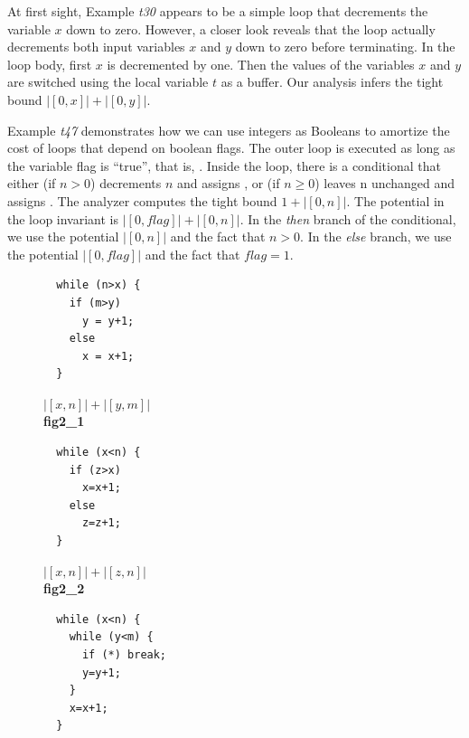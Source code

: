 \documentclass[nocopyrightspace,preprint,pldi]{sigplanconf-pldi15}
\begin{document}
{At first sight, Example \emph{t30} appears to be a simple loop that
decrements the variable $x$ down to zero.  However, a closer look
reveals that the loop actually decrements both input variables $x$ and
$y$ down to zero before terminating.  In the loop body, first $x$ is
decremented by one.  Then the values of the variables $x$ and $y$ are
switched using the local variable $t$ as a buffer.  Our analysis
infers the tight bound $|[0,x]|+|[0,y]|$.

Example \emph{t47} demonstrates how we can use integers as Booleans to
amortize the cost of loops that depend on boolean flags.  The outer
loop is executed as long as the variable flag is ``true'', that is,
.  Inside the loop, there is a conditional that either
(if $n>0$) decrements $n$ and assigns , or (if $n\geq0$)
leaves n unchanged and assigns .  The analyzer computes
the tight bound $1 + |[0, n]|$.  The potential in the loop invariant
is $|[0,\mathit{flag}]| + |[0, n]|$.  In the \emph{then} branch of
the conditional, we use the potential $|[0, n]|$ and the fact that
$n>0$.  In the \emph{else} branch, we use the potential
$|[0,\mathit{flag}]|$ and the fact that $\mathit{flag}=1$.




\begin{figure}
 \setlength{\progwidth}{.24\linewidth}
  \centering
  \begin{minipage}[b]{\progwidth}
    \begin{center}
   \begin{lstlisting}
  while (n>x) {
    if (m>y)
      y = y+1;
    else
      x = x+1;
  }
   \end{lstlisting}

$|[x, n]| + |[y, m]|$
\\[.7\baselineskip]
      {\bf fig2\_1}
    \end{center}
  \end{minipage}
%
%
  \begin{minipage}[b]{\progwidth}
    \begin{center}
   \begin{lstlisting}
  while (x<n) {
    if (z>x)
      x=x+1;
    else
      z=z+1;
  }
   \end{lstlisting}

$|[x, n]| + |[z, n]|$
\\[.7\baselineskip]
      {\bf fig2\_2}
    \end{center}
  \end{minipage}
%
%
  \begin{minipage}[b]{\progwidth}
    \begin{center}
   \begin{lstlisting}
  while (x<n) {
    while (y<m) {
      if (*) break;
      y=y+1;
    }
    x=x+1;
  }
   \end{lstlisting}


\end{center}
\end{minipage}
\end{figure}}
\end{document}

